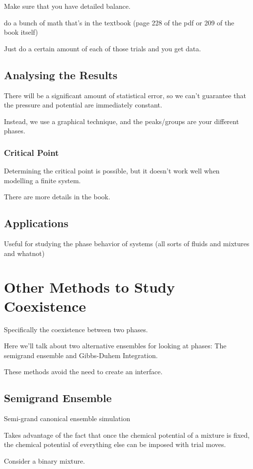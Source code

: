 \documentclass[fleqn]{report}
\begin{document}
Make sure that you have detailed balance. 

do a bunch of math that's in the textbook (page 228 of the pdf or 209 of the book
itself)

Just do a certain amount of each of those trials and you get data. 

\section{Analysing the Results}
There will be a significant amount of statistical error, so we 
can't guarantee that the pressure and potential are immediately constant. 

Instead, we use a graphical technique, and the peaks/groups are your 
different phases. 

\subsection{Critical Point}
Determining the critical point is possible, but it doesn't work well 
when modelling a finite system. 

There are more details in the book. 

\section{Applications}
Useful for studying the phase behavior of systems (all sorts of fluids and 
mixtures and whatnot)

\chapter{Other Methods to Study Coexistence}
Specifically the coexistence between two phases. 

Here we'll talk about two alternative ensembles for looking at phases:
The semigrand ensemble and Gibbs-Duhem Integration.

These methods avoid the need to create an interface. 

\section{Semigrand Ensemble}
Semi-grand canonical ensemble simulation

Takes advantage of the fact that once the chemical potential of 
a mixture is fixed, the chemical potential of everything else 
can be imposed with trial moves. 

Consider a binary mixture. 
\end{document}
